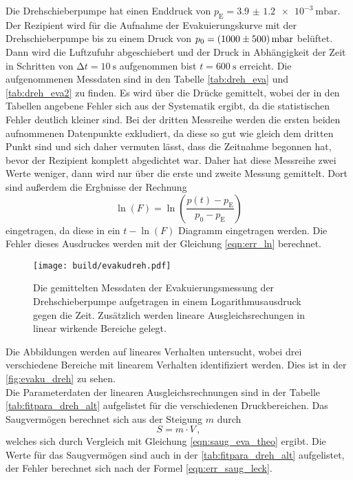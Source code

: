     \noindent Die Drehschieberpumpe hat einen Enddruck von $p_\text{E} = \SI{3.9(12)e-3}{\milli\bar}$. Der Rezipient wird für die Aufnahme der Evakuierungskurve mit der Drehschieberpumpe 
    bis zu einem Druck von $p_0 = \SI{1000 \pm 500}{\milli\bar}$ belüftet. Dann wird die Luftzufuhr abgeschiebert und der Druck in Abhängigkeit der Zeit in 
    Schritten von $\increment t = \SI{10}{\second}$ aufgenommen bist $t = \SI{600}{\second}$ erreicht. Die aufgenommenen Messdaten sind in den Tabelle \ref{tab:dreh_eva} und \ref{tab:dreh_eva2} zu finden. 
    Es wird über die Drücke gemittelt, wobei der in den Tabellen angebene Fehler sich aus der Systematik ergibt, da die statistischen Fehler deutlich kleiner sind.
    Bei der dritten Messreihe werden die ersten beiden aufnommenen Datenpunkte exkludiert, da diese so gut wie gleich dem dritten Punkt sind und sich 
    daher vermuten lässt, dass die Zeitnahme begonnen hat, bevor der Rezipient komplett abgedichtet war. Daher hat diese Messreihe zwei Werte weniger, dann wird nur über die 
    erste und zweite Messung gemittelt.
    Dort sind außerdem die Ergbnisse der Rechnung 
    \begin{equation*}
      \ln(F) = \ln \left( \frac{p(t) - p_\text{E}}{p_0 - p_\text{E}}\right)
    \end{equation*}
    eingetragen, da diese in ein $t - \ln(F)$ Diagramm eingetragen werden. Die Fehler dieses Ausdruckes werden mit der Gleichung \eqref{eqn:err_ln} berechnet.  

    \begin{figure}[H]
      \centering
      \texttt{[image: build/evakudreh.pdf]}
      \caption{Die gemittelten Messdaten der Evakuierungsmessung der Drehschieberpumpe aufgetragen in einem Logarithmusausdruck gegen die Zeit. Zusätzlich werden lineare Ausgleichsrechungen in linear wirkende Bereiche gelegt.}
      \label{fig:evaku_dreh}
    \end{figure}

    \noindent Die Abbildungen werden auf lineares Verhalten untersucht, wobei drei verschiedene Bereiche mit linearem Verhalten identifiziert werden. 
    Dies ist in der \autoref{fig:evaku_dreh} zu sehen.  \\ 
    Die Parameterdaten der linearen Ausgleichsrechnungen sind in der Tabelle \autoref{tab:fitpara_dreh_alt} aufgelistet für die verschiedenen Druckbereichen. Das Saugvermögen berechnet sich 
    aus der Steigung $m$ durch 
    \begin{equation*}
      S = m \cdot V\, ,
    \end{equation*}
    welches sich durch Vergleich mit Gleichung \eqref{eqn:saug_eva_theo} ergibt.
    Die Werte für das Saugvermögen sind auch in der \autoref{tab:fitpara_dreh_alt} aufgelistet, der Fehler berechnet sich nach der Formel \eqref{eqn:err_saug_leck}. 

